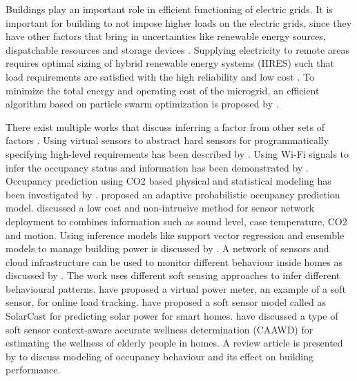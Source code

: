 \documentclass[]{interact}
\theoremstyle{plain}%
\theoremstyle{definition}
\theoremstyle{remark}
\begin{document}

Buildings play an important role in efficient functioning of electric grids. 
It is important for building to not impose higher loads on the electric grids, since they have other factors that bring in uncertainties like renewable energy sources, dispatchable resources and storage devices \citep{tf_pricing}.
Supplying electricity to remote areas requires optimal sizing of hybrid renewable energy systems (HRES) such that load requirements are satisfied with the high reliability and low cost \citep{tf_renewable}. 
To minimize the total energy and operating cost of the microgrid, an efficient algorithm based on particle swarm optimization is proposed by \cite{tf_swarm}.  


There exist multiple works that discuss inferring a factor from other sets of factors \citep{anshuleEnergy16, balaji}.   
Using virtual sensors to abstract hard sensors for programmatically specifying high-level requirements has been described by \cite{virtual_senors}.   
Using Wi-Fi signals to infer the occupancy status and information has been demonstrated by \cite{occupancy_wifi, softgreen}.
Occupancy prediction using CO2 based physical and statistical modeling has been investigated by \cite{elsevier_co2}. 
\cite{elsevier_occ_realtime}  proposed an adaptive probabilistic occupancy prediction model.
\cite{brown_fan}  discussed a low cost and non-intrusive method for sensor network deployment to combines information such as sound level, case temperature, CO2 and motion.
Using inference models like support vector regression and ensemble models to manage building power is discussed by \cite{tcps_bellala}.  
A network of sensors and cloud infrastructure can be used to monitor different behaviour inside homes as discussed by \cite{sensors_cloud_behaviour}. 
The work uses different soft sensing approaches to infer different behavioural patterns.
 \cite{tcps_virtualpowermeter} have proposed a virtual power meter, an example of a soft sensor, for online load tracking.  
\cite{tcps_solarcast} have proposed a soft sensor model called as SolarCast for predicting solar power for smart homes.  
\cite{sensors_caawd} have discussed a type of soft sensor {context-aware accurate	wellness determination (CAAWD)} for estimating the wellness of elderly people in homes. 
A review article  is presented by \cite{scs_ob} to discuss modeling of occupancy behaviour and its effect on building performance.
\end{document}
